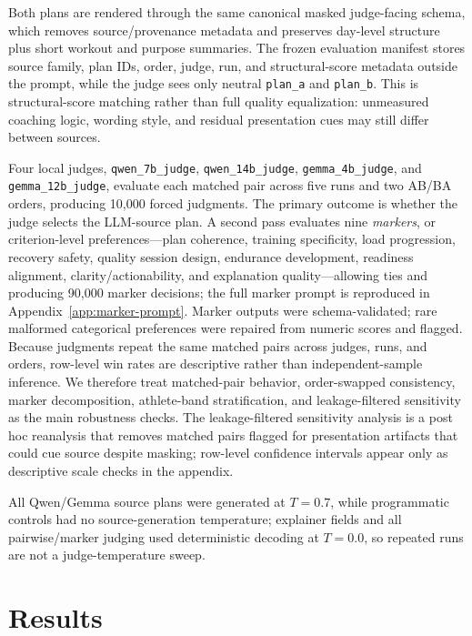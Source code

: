 \documentclass[11pt]{article}
\begin{document}
Both plans are rendered through the same canonical masked judge-facing schema, which removes source/provenance metadata and preserves day-level structure plus short workout and purpose summaries. The frozen evaluation manifest stores source family, plan IDs, order, judge, run, and structural-score metadata outside the prompt, while the judge sees only neutral \texttt{plan\_a} and \texttt{plan\_b}. This is structural-score matching rather than full quality equalization: unmeasured coaching logic, wording style, and residual presentation cues may still differ between sources.

Four local judges, \texttt{qwen\_7b\_judge}, \texttt{qwen\_14b\_judge}, \texttt{gemma\_4b\_judge}, and \texttt{gemma\_12b\_judge}, evaluate each matched pair across five runs and two AB/BA orders, producing 10,000 forced judgments. The primary outcome is whether the judge selects the LLM-source plan. A second pass evaluates nine \emph{markers}, or criterion-level preferences---plan coherence, training specificity, load progression, recovery safety, quality session design, endurance development, readiness alignment, clarity/actionability, and explanation quality---allowing ties and producing 90,000 marker decisions; the full marker prompt is reproduced in Appendix~\ref{app:marker-prompt}. Marker outputs were schema-validated; rare malformed categorical preferences were repaired from numeric scores and flagged. Because judgments repeat the same matched pairs across judges, runs, and orders, row-level win rates are descriptive rather than independent-sample inference. We therefore treat matched-pair behavior, order-swapped consistency, marker decomposition, athlete-band stratification, and leakage-filtered sensitivity as the main robustness checks. The leakage-filtered sensitivity analysis is a post hoc reanalysis that removes matched pairs flagged for presentation artifacts that could cue source despite masking; row-level confidence intervals appear only as descriptive scale checks in the appendix.

All Qwen/Gemma source plans were generated at \(T=0.7\), while programmatic controls had no source-generation temperature; explainer fields and all pairwise/marker judging used deterministic decoding at \(T=0.0\), so repeated runs are not a judge-temperature sweep.

\section{Results}
\end{document}
